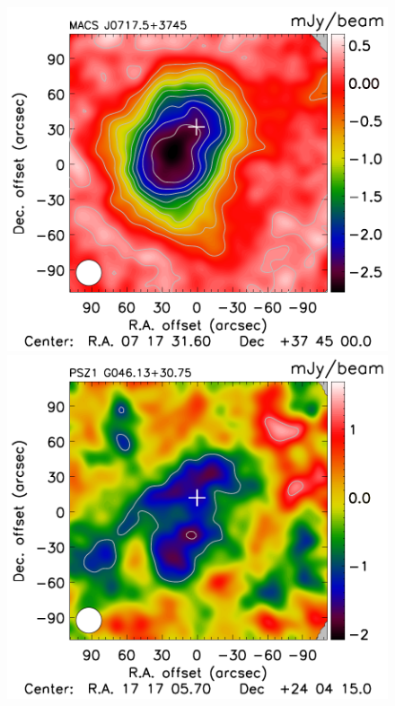\documentclass[twocolumn,traditabstract]{aa}
\begin{document}
\begin{figure}[h]
\includegraphics[trim=0cm 0cm 0cm 0cm, clip=true, totalheight=5.4cm]{Figure/Map_MACSJ0717.pdf}
\includegraphics[trim=0cm 0cm 0cm 0cm, clip=true, totalheight=5.4cm]{Figure/Map_PSZ1G046.pdf}

\end{figure}
\end{document}
